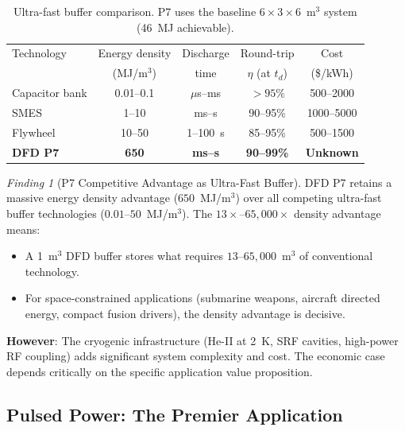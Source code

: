 \documentclass[11pt]{article}
\theoremstyle{definition}
\theoremstyle{remark}
\newtheorem{finding}[theorem]{Finding}
\begin{document}
\begin{table}[h]
\centering
\caption{Ultra-fast buffer comparison. P7 uses the baseline
$6\times3\times6$~m$^3$ system (46~MJ achievable).}
\label{tab:P7-comparison}
\begin{tabular}{@{}lcccc@{}}
\toprule
Technology & Energy density & Discharge & Round-trip & Cost \\
 & (MJ/m$^3$) & time & $\eta$ (at $t_d$) & (\$/kWh) \\
\midrule
Capacitor bank & 0.01--0.1 & $\mu$s--ms & $> 95\%$ & 500--2000 \\
SMES & 1--10 & ms--s & 90--95\% & 1000--5000 \\
Flywheel & 10--50 & 1--100~s & 85--95\% & 500--1500 \\
\textbf{DFD P7} & \textbf{650} & \textbf{ms--s}
  & \textbf{90--99\%} & \textbf{Unknown} \\
\bottomrule
\end{tabular}
\end{table}

\begin{finding}[P7 Competitive Advantage as Ultra-Fast Buffer]
\label{finding:P7-advantage}
DFD P7 retains a massive energy density advantage ($650$~MJ/m$^3$)
over all competing ultra-fast buffer technologies ($0.01$--$50$~MJ/m$^3$).
The $13\times$--$65{,}000\times$ density advantage means:
\begin{itemize}[nosep]
\item A 1~m$^3$ DFD buffer stores what requires $13$--$65{,}000$~m$^3$
  of conventional technology.
\item For space-constrained applications (submarine weapons, aircraft
  directed energy, compact fusion drivers), the density advantage is
  decisive.
\end{itemize}

\textbf{However}: The cryogenic infrastructure (He-II at 2~K, SRF
cavities, high-power RF coupling) adds significant system complexity
and cost. The economic case depends critically on the specific
application value proposition.
\end{finding}

\subsection{Pulsed Power: The Premier Application}
\end{document}
